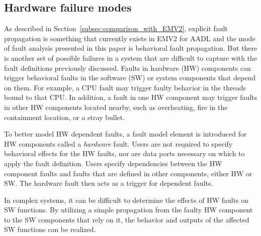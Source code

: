 \subsection{Hardware failure modes} 
As described in Section~\ref{subsec:comparison_with_EMV2}, explicit fault propagation is something that currently exists in EMV2 for AADL and the mode of fault analysis presented in this paper is behavioral fault propagation. But there is another set of possible failures in a system that are difficult to capture with the fault definitions previously discussed. Faults in hardware (HW) components can trigger behavioral faults in the software (SW) or system components that depend on them. For example, a CPU fault may trigger faulty behavior in the threads bound to that CPU. In addition, a fault in one HW component may trigger faults in other HW components located nearby, such as overheating, fire in the containment location, or a stray bullet. 

To better model HW dependent faults, a fault model element is introduced for HW components called a \textit{hardware} fault. Users are not required to specify behavioral effects for the HW faults, nor are data ports necessary on which to apply the fault definition. Users specify dependencies between the HW component faults and faults that are defined in other components, either HW or SW. The hardware fault then acts as a trigger for dependent faults. 

In complex systems, it can be difficult to determine the effects of HW faults on SW functions. By utilizing a simple propagation from the faulty HW component to the SW components that rely on it, the behavior and outputs of the affected SW functions can be realized. 

